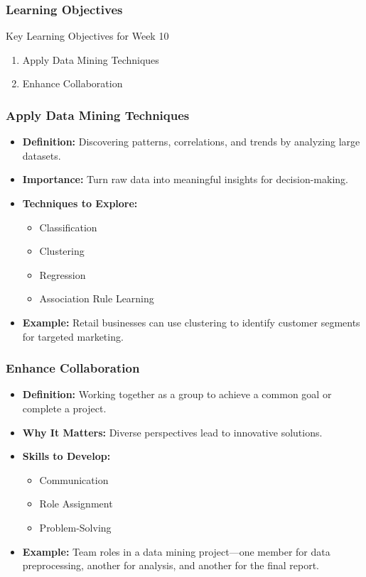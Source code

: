 \documentclass{beamer}
\begin{document}
\begin{frame}[fragile]
    \frametitle{Learning Objectives}
    \begin{block}{Key Learning Objectives for Week 10}
        \begin{enumerate}
            \item Apply Data Mining Techniques
            \item Enhance Collaboration
        \end{enumerate}
    \end{block}
\end{frame}

\begin{frame}[fragile]
    \frametitle{Apply Data Mining Techniques}
    \begin{itemize}
        \item \textbf{Definition:} Discovering patterns, correlations, and trends by analyzing large datasets.
        \item \textbf{Importance:} Turn raw data into meaningful insights for decision-making.
        \item \textbf{Techniques to Explore:}
            \begin{itemize}
                \item Classification
                \item Clustering
                \item Regression
                \item Association Rule Learning
            \end{itemize}
        \item \textbf{Example:} Retail businesses can use clustering to identify customer segments for targeted marketing.
    \end{itemize}
\end{frame}

\begin{frame}[fragile]
    \frametitle{Enhance Collaboration}
    \begin{itemize}
        \item \textbf{Definition:} Working together as a group to achieve a common goal or complete a project.
        \item \textbf{Why It Matters:} Diverse perspectives lead to innovative solutions.
        \item \textbf{Skills to Develop:}
            \begin{itemize}
                \item Communication
                \item Role Assignment
                \item Problem-Solving
            \end{itemize}
        \item \textbf{Example:} Team roles in a data mining project—one member for data preprocessing, another for analysis, and another for the final report.
    \end{itemize}
\end{frame}
\end{document}
